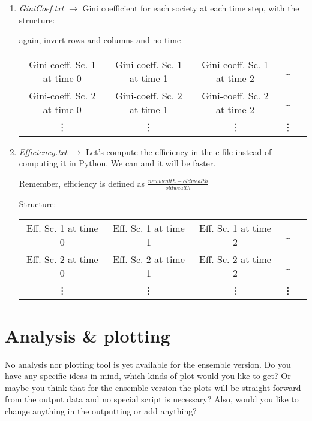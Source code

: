 \documentclass{article}
\begin{document}
\begin{enumerate}
\item \emph{GiniCoef.txt} $\rightarrow$ Gini coefficient for each society at each time step, with the structure:

{\color{red}again, invert rows and columns and no time}

\begin{center}
\begin{tabular}{c c c c c}
Gini-coeff. Sc. 1 at time 0 & Gini-coeff. Sc. 1 at time 1  & Gini-coeff. Sc. 1 at time 2   & \dots \\
Gini-coeff. Sc. 2 at time 0 & Gini-coeff. Sc. 2 at time 1  & Gini-coeff. Sc. 2 at time 2   & \dots \\
\vdots & \vdots &  \vdots &  \vdots &
\end{tabular}
\end{center} 

\item {\color{red}\emph{Efficiency.txt} $\rightarrow$ Let's compute the efficiency in the c file instead of computing it in Python. We can and it will be faster.

Remember, efficiency is defined as  $\frac{newwealth - oldwealth}{oldwealth}$}

Structure:
\begin{center}
\begin{tabular}{c c c c c}
Eff. Sc. 1 at time 0 & Eff. Sc. 1 at time 1  & Eff. Sc. 1 at time 2   & \dots \\
Eff. Sc. 2 at time 0 & Eff. Sc. 2 at time 1  & Eff. Sc. 2 at time 2   & \dots \\
\vdots & \vdots &  \vdots &  \vdots &
\end{tabular} 
\end{center}


\end{enumerate}


\section{Analysis \& plotting}
No analysis nor plotting tool is yet available for the ensemble version. Do you have any specific ideas in mind, which kinds of plot would you like to get? Or maybe you think that for the ensemble version the plots will be straight forward from the output data and no special script is necessary? Also, would you like to change anything in the outputting or add anything?
\end{document}
